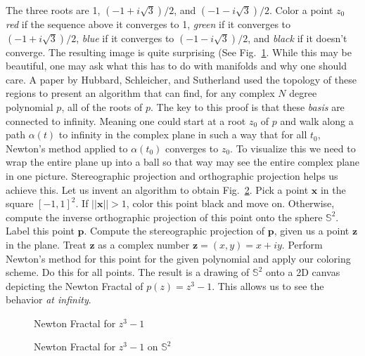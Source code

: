 \documentclass{article}
\theoremstyle{plain}
\theoremstyle{normal}
\begin{document}
        The three roots are 1, $(-1+i\sqrt{3})/2$, and $(-1-i\sqrt{3})/2$. Color
        a point $z_{0}$ \textit{red} if the sequence above it converges to 1,
        \textit{green} if it converges to $(-1+i\sqrt{3})/2$, \textit{blue} if
        it converges to $(-1-i\sqrt{3})/2$, and \textit{black} if it doesn't
        converge. The resulting image is quite surprising
        (See Fig.~\ref{fig:newton_fractal_cubic}. While this may be beautiful,
        one may ask what this has to do with manifolds and why one should care.
        A paper by Hubbard, Schleicher, and Sutherland used the topology of
        these regions to present an algorithm that can find, for any complex
        $N$ degree polynomial $p$, all of the roots of $p$. The key to this
        proof is that these \textit{basis} are connected to infinity. Meaning
        one could start at a root $z_{0}$ of $p$ and walk along a path
        $\alpha(t)$ to infinity in the complex plane in such a way that for all
        $t_{0}$, Newton's method applied to $\alpha(t_{0})$ converges to
        $z_{0}$. To visualize this we need to wrap the entire plane up into a
        ball so that way may see the entire complex plane in one picture.
        Stereographic projection and orthographic projection helps us achieve
        this. Let us invent an algorithm to obtain
        Fig.~\ref{fig:newton_fractal_on_sphere}. Pick a point $\mathbf{x}$ in
        the square $[-1,1]^{2}$. If $||\mathbf{x}||>1$, color this point black
        and move on. Otherwise, compute the inverse orthographic projection of
        this point onto the sphere $\mathbb{S}^{2}$. Label this point
        $\mathbf{p}$. Compute the stereographic projection of $\mathbf{p}$,
        given us a point $\mathbf{z}$ in the plane. Treat $\mathbf{z}$ as a
        complex number $\mathbf{z}=(x,y)=x+iy$. Perform Newton's method for
        this point for the given polynomial and apply our coloring scheme. Do
        this for all points. The result is a drawing of $\mathbb{S}^{2}$ onto
        a 2D canvas depicting the Newton Fractal of $p(z)=z^{3}-1$. This allows
        us to see the behavior \textit{at infinity}.
        \begin{figure}
            \centering
            \caption{Newton Fractal for $z^{3}-1$}
            \label{fig:newton_fractal_cubic}
        \end{figure}
        \begin{figure}
            \centering
            \caption{Newton Fractal for $z^{3}-1$ on $\mathbb{S}^{2}$}
            \label{fig:newton_fractal_on_sphere}
        \end{figure}
\end{document}
